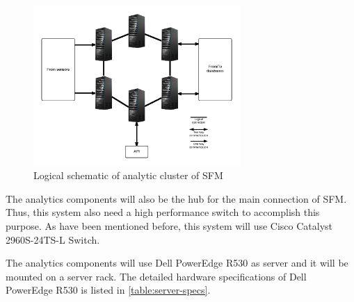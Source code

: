\begin{figure}[hb!]
\centering
\includegraphics[width=0.7\textwidth]{6-hardware/images/analytic-cluster.png}
\caption{Logical schematic of analytic cluster of SFM}
\label{fig:analytic-cluster}
\end{figure}

The analytics components will also be the hub for the main connection of SFM. Thus, this system also need a high performance switch to accomplish this purpose. As have been mentioned before, this system will use Cisco Catalyst 2960S-24TS-L Switch.

The analytics components will use Dell PowerEdge R530 as server and it will be mounted on a server rack. The detailed hardware specifications of Dell PowerEdge R530 is listed in \autoref{table:server-specs}.


